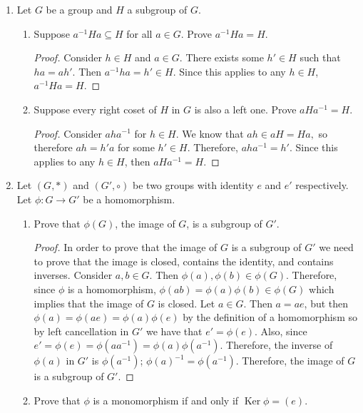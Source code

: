 \documentclass[11pt]{article}
\DeclareMathOperator{\Ker}{Ker}
\begin{document}
\begin{enumerate}
\pagebreak

\item Let $G$ be a group and $H$ a subgroup of $G$.  
\begin{enumerate}
\item Suppose $a^{-1} H a \subseteq H$ for all $a \in G$.  
Prove $a^{-1} H a = H$.

\begin{proof}
Consider $h\in H$ and $a\in G$. There exists some $h'\in H$ such that $ha=ah'$. Then $a^{-1}ha=h'\in H$. Since this applies to any $h\in H$, $a^{-1}Ha=H$.
\end{proof}

\item Suppose every right coset of $H$ in $G$ is also a left one.  
Prove $aHa^{-1} = H$.

\begin{proof}
Consider $aha^{-1}$ for $h\in H$. We know that $ah\in aH=Ha,$ so therefore $ah=h'a$ for some $h'\in H$. Therefore, $aha^{-1}=h'$. Since this applies to any $h\in H$, then $aHa^{-1}=H$.
\end{proof}

\end{enumerate}
\pagebreak

\item Let $(G, \ast)$ and $(G', \circ)$ be two groups with identity 
$e$ and $e'$ respectively.
Let $\phi: G \rightarrow G'$ be a homomorphism.
\begin{enumerate}
\item Prove that $\phi(G)$, the image of $G$, is a subgroup of $G'$.

\begin{proof}
In order to prove that the image of $G$ is a subgroup of $G'$ we need to prove that the image is closed, contains the identity, and contains inverses. Consider $a,b\in G$. Then $\phi(a), \phi(b)\in \phi(G).$ Therefore, since $\phi$ is a homomorphism, $\phi(ab)=\phi(a)\phi(b)\in\phi(G)$ which implies that the image of $G$ is closed. Let $a\in G.$ Then $a=ae$, but then $\phi (a)=\phi(ae)=\phi(a)\phi(e)$  by the definition of a homomorphism so by left cancellation in $G'$ we have that $e'=\phi(e).$ Also, since $e'=\phi(e)=\phi(aa^{-1})= \phi(a)\phi(a^{-1}).$ Therefore, the inverse of $\phi(a)$ in $G'$ is $\phi(a^{-1})$; $\phi(a)^{-1}=\phi(a^{-1}).$ Therefore, the image of $G$ is a subgroup of $G'.$
\end{proof}

\item Prove that $\phi$ is a monomorphism if and only if $\Ker \phi = (e)$.


\end{enumerate}
\end{enumerate}
\end{document}
